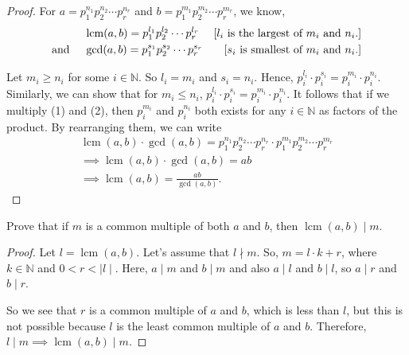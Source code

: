 \documentclass[12pt]{article}
\newenvironment{exercise}[2][Exercise]{\begin{trivlist}
\item[\hskip \labelsep {\bfseries #1}\hskip \labelsep {\bfseries #2.}]}{\end{trivlist}}
\DeclareMathOperator{\lcm}{lcm}
\begin{document}
\begin{proof}
For $a=p_1^{n_1} p_2^{n_2} \cdots p_r^{n_r}$ and $b = p_1^{m_1} p_2^{m_2} \cdots p_r^{m_r}$, we know,
\begin{align}
& \lcm(a,b) = p_1^{l_1} p_2^{l_2} \cdots p_r^{l_r} & \text{[$l_i$ is the largest of $m_i$ and $n_i$.]} \\
\text{and \quad} & \gcd(a, b) = p_1^{s_1} p_2^{s_2} \cdots p_r^{s_r} & \text{[$s_i$ is smallest of $m_i$ and $n_i$.]}
\end{align}

Let $m_i \geq n_i$ for some $i \in \mathbb{N}$. So $l_i=m_i$ and $s_i=n_i$. Hence, $p_i^{l_i}\cdot p_i^{s_i} = p_i^{m_i}\cdot p_i^{n_i}$. Similarly, we can show that for $m_i\leq n_i$, $p_i^{l_i}\cdot p_i^{s_i} = p_i^{m_i}\cdot p_i^{n_i}$. It follows that if we multiply (1) and (2), then $p_i^{m_i}$ and $p_i^{n_i}$ both exists for any $i\in \mathbb{N}$ as factors of the product. By rearranging them, we can write
\begin{gather*}
\lcm(a,b)\cdot \gcd(a,b)=p_1^{n_1} p_2^{n_2} \cdots p_r^{n_r}\cdot p_1^{m_1} p_2^{m_2} \cdots p_r^{m_r}\\
\implies \lcm(a,b)\cdot \gcd(a,b) = ab \\
\implies \lcm(a, b) = \frac{ab}{\gcd(a, b)}.
\end{gather*}
\end{proof}

\begin{exercise}{13}
Prove that if \( m \) is a common multiple of both \( a \) and \( b \), then \( \lcm(a, b) \mid m \).
\end{exercise}

\begin{proof}
Let \( l = \lcm(a, b) \). Let's assume that \( l \nmid m \).  So, \( m = l \cdot k + r \), where \( k \in \mathbb{N} \) and \( 0 < r < \mid l \mid \).  Here, \( a \mid m \) and \( b \mid m \) and also \( a \mid l \) and \( b \mid l \), so \( a \mid r \) and \( b \mid r \). 

So we see that \( r \) is a common multiple of \( a \) and \( b \), which is less than \( l \), but this is not possible because $l$ is the least common multiple of $a$ and $b$. Therefore, \( l \mid m \implies \lcm(a, b) \mid m \).
\end{proof}














 
\end{document}
